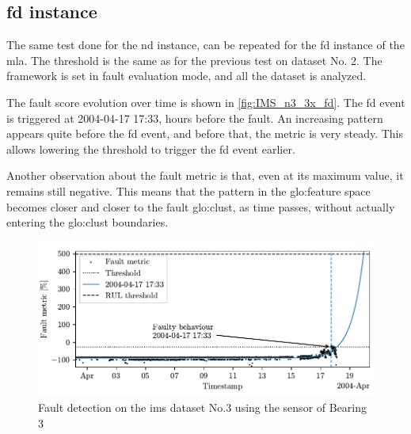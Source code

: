 \subsection{\gls{fd} instance}

The same test done for the \gls{nd} instance, can be repeated for the \gls{fd} instance of the \gls{mla}. The threshold is the same as for the previous test on dataset No. 2. The framework is set in fault evaluation mode, and all the dataset is analyzed. 

The fault score evolution over time is shown in \autoref{fig:IMS_n3_3x_fd}. 
The \gls{fd} event is triggered at 2004-04-17 17:33, hours before the fault.
An increasing pattern appears quite before the \gls{fd} event, and before that, the metric is very steady. This allows lowering the threshold to trigger the \gls{fd} event earlier.

Another observation about the fault metric is that, even at its maximum value, it remains still negative. This means that the pattern in the \gls{glo:feature} space becomes closer and closer to the fault \gls{glo:clust}, as time passes, without actually entering the \gls{glo:clust} boundaries.

\begin{figure}
    \centering
    \includegraphics{images/IMS/Test03/FD.pdf}
    \caption{Fault detection on the \gls{ims} dataset No.3 using the sensor of Bearing 3}
    \label{fig:IMS_n3_3x_fd}
\end{figure}